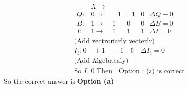 \begin{enumerate}
\begin{answer}
$$\begin{aligned}
&\begin{array}{llllll} & X \rightarrow & & & & \\ Q: & 0 \rightarrow & +1 & -1 & 0 & \Delta Q=0 \\ B: & 1 \rightarrow & 1 & 0 & 0 & \Delta B=0 \\ I: & 1 \rightarrow & 1 & 1 & 1 & \Delta I=0\end{array}\\
&\text{(Add vectroriarly vecterly)}\\
&I_3: 0 \quad+1 \quad-1 \quad 0 \quad \Delta I_3=0\\
&\text{(Add Algebricaly)}\\
&\text{So }I_=0\text{ Then$\quad$
Option : (a) is correct}
\end{aligned}
$$
So the correct answer is \textbf{Option (a)}
\end{answer}
	
	
	
	
	
	
	
	
	
	
	
	
	
	
	
	
	
	
	
	
	
	
	
	
	
	
	
	
	
	
	
	
	
	
\end{enumerate}